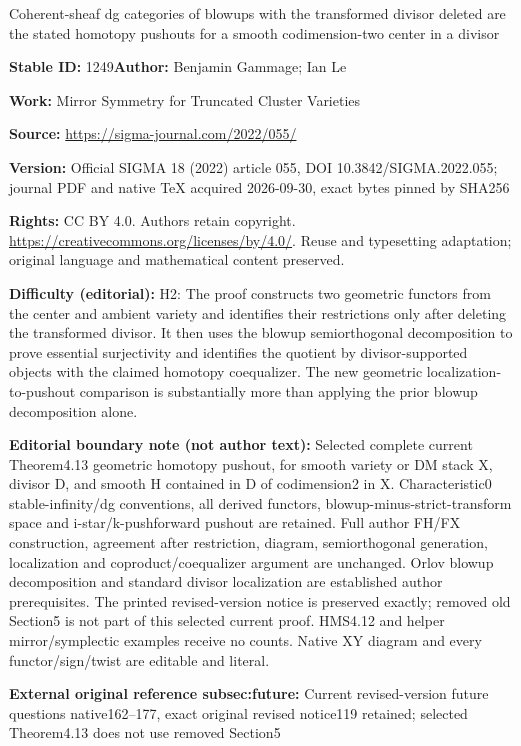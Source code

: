 \documentclass[11pt]{article}
\numberwithin{equation}{section}
\numberwithin{equation}{section}
\begin{document}
\begin{center}\Large Coherent-sheaf dg categories of blowups with the transformed divisor deleted are the stated homotopy pushouts for a smooth codimension-two center in a divisor\end{center}
\noindent\textbf{Stable ID:} 1249\quad\textbf{Author:} Benjamin Gammage; Ian Le\par
\noindent\textbf{Work:} Mirror Symmetry for Truncated Cluster Varieties\par
\noindent\textbf{Source:} \url{https://sigma-journal.com/2022/055/}\par
\noindent\textbf{Version:} Official SIGMA 18 (2022) article 055, DOI 10.3842/SIGMA.2022.055; journal PDF and native TeX acquired 2026-09-30, exact bytes pinned by SHA256\par
\noindent\textbf{Rights:} CC BY 4.0. Authors retain copyright. \url{https://creativecommons.org/licenses/by/4.0/}. Reuse and typesetting adaptation; original language and mathematical content preserved.\par
\noindent\textbf{Difficulty (editorial):} {\CJKfont H2: The proof constructs two geometric functors from the center and ambient variety and identifies their restrictions only after deleting the transformed divisor. It then uses the blowup semiorthogonal decomposition to prove essential surjectivity and identifies the quotient by divisor-supported objects with the claimed homotopy coequalizer. The new geometric localization-to-pushout comparison is substantially more than applying the prior blowup decomposition alone.}\par
\medskip\noindent\textbf{Editorial boundary note (not author text):} Selected complete current Theorem4.13 geometric homotopy pushout, for smooth variety or DM stack X, divisor D, and smooth H contained in D of codimension2 in X. Characteristic0 stable-infinity/dg conventions, all derived functors, blowup-minus-strict-transform space and i-star/k-pushforward pushout are retained. Full author FH/FX construction, agreement after restriction, diagram, semiorthogonal generation, localization and coproduct/coequalizer argument are unchanged. Orlov blowup decomposition and standard divisor localization are established author prerequisites. The printed revised-version notice is preserved exactly; removed old Section5 is not part of this selected current proof. HMS4.12 and helper mirror/symplectic examples receive no counts. Native XY diagram and every functor/sign/twist are editable and literal.\par
\noindent\textbf{External original reference subsec:future:} Current revised-version future questions native162–177, exact original revised notice119 retained; selected Theorem4.13 does not use removed Section5\par
\end{document}
